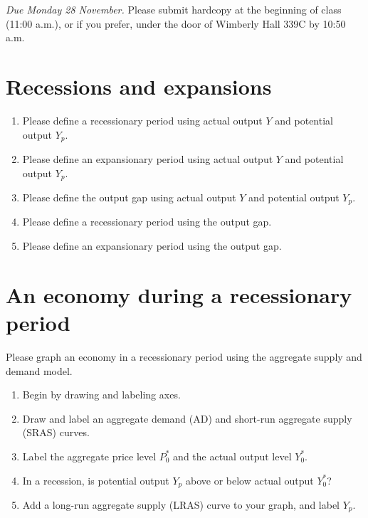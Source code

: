 \documentclass{assignment}
\date{Wednesday 21 November 2022}
\begin{document}
\RaggedRight

\beginassignment{}

\emph{Due Monday 28 November.} Please submit hardcopy at the beginning of class (11:00 a.m.), or if you prefer, under the door of Wimberly Hall 339C by 10:50 a.m.

\section{Recessions and expansions}

\begin{enumerate}
\item Please define a recessionary period using actual output $Y$ and potential output $Y_p$.
\vfill
\item Please define an expansionary period using actual output $Y$ and potential output $Y_p$.
\vfill
\item Please define the output gap using actual output $Y$ and potential output $Y_p$.
\vfill
\item Please define a recessionary period using the output gap.
\vfill
\item Please define an expansionary period using the output gap.
\vfill
\end{enumerate}

\vspace{-2\baselineskip}
\clearpage

\section{An economy during a recessionary period} \label{sec:recession}

Please graph an economy in a recessionary period using the aggregate supply and demand model.

\begin{enumerate}
\item Begin by drawing and labeling axes.
\item Draw and label an aggregate demand (AD) and short-run aggregate supply (SRAS) curves.
\item Label the aggregate price level $P^*_0$ and the actual output level $Y^*_0$.
\item In a recession, is potential output $Y_p$ above or below actual output $Y^*_0$? \hfill \underline{\hspace{1.5in}}
\item Add a long-run aggregate supply (LRAS) curve to your graph, and label $Y_p$.
\end{enumerate}
\end{document}
